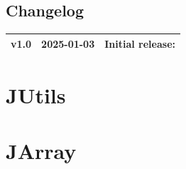 \documentclass[11pt,openany]{article}
\begin{document}
\vfill
\subsection*{Changelog}
\large
\begin{tabular}{@{} L{0.05\textwidth} L{0.2\textwidth} L{0.7\textwidth} @{}} %
	\toprule
	v1.0 & 2025-01-03 & Initial release: \\%
	\bottomrule
\end{tabular}

\newpage


\tableofcontents

\newpage
\section{JUtils}


\newpage
\section{JArray}


\vfill
\begin{thebibliography}{9}\large
\end{thebibliography}

\newpage
\appendix

%
\end{document}
